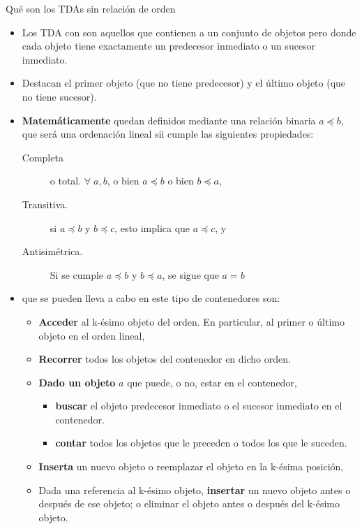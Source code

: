 \documentclass[10pt,envcountsect,spanish]{beamer}
\begin{document}
\begin{frame}{Qué son los TDAs sin relación de orden}

\begin{itemize}%

\item Los TDA con  son aquellos que contienen a un conjunto de objetos pero donde cada objeto tiene exactamente un predecesor inmediato o un sucesor inmediato. 

\item Destacan el primer objeto (que no tiene predecesor) y el último objeto (que no tiene sucesor). 

\item \textbf{Matemáticamente} quedan definidos mediante una relación binaria $a\preceq b$, que será una ordenación lineal sii cumple las siguientes propiedades:
\begin{description}
\item[Completa]  o total. $\forall \; a, b$, o bien $a\preceq b$ o bien $b\preceq a$,
\item[Transitiva.] si $a\preceq b$ y $b\preceq c$, esto implica que $a\preceq c$, y
\item[Antisimétrica.] Si se cumple   $a\preceq b$ y $b\preceq a$, se sigue que $a = b$
\end{description}


\item {} que se pueden lleva a cabo en este tipo de contenedores son:
\begin{itemize}
\item \textbf{Acceder} al k-ésimo objeto del orden. En particular, al primer o último objeto en el orden lineal,
\item \textbf{Recorrer} todos los objetos del contenedor en dicho orden.
\item \textbf{Dado un objeto} $a$ que puede, o no,  estar en el contenedor, 
	\begin{itemize}
	\item \textbf{buscar} el objeto predecesor inmediato o el sucesor inmediato en el contenedor.
	\item \textbf{contar} todos los objetos que le preceden o todos los que le suceden.
	\end{itemize}
\item \textbf{Inserta} un nuevo objeto o reemplazar el objeto en la k-ésima posición,
\item Dada una referencia al k-ésimo objeto, \textbf{insertar} un nuevo objeto antes o después de ese objeto; o eliminar el objeto antes o después del k-ésimo objeto.
\end{itemize}


\end{itemize}

\end{frame}
\end{document}
